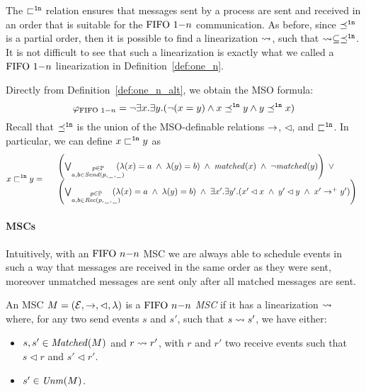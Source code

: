 The ${\sqsubset^{\mathtt{1n}}}$ relation ensures that messages sent by a process are sent and received in an order that is suitable for the $\text{FIFO } 1\mathsf{-}n$ communication. As before, since ${\preceq^{\mathtt{1n}}}$ is a partial order, then it is possible to find a linearization $\rightsquigarrow$, such that $\rightsquigarrow \subseteq \preceq^{\mathtt{1n}}$. It is not difficult to see that such a linearization is exactly what we called a $\text{FIFO } 1\mathsf{-}n$ linearization in Definition~\ref{def:one_n}. 

Directly from  Definition~\ref{def:one_n_alt}, we obtain the MSO formula:
\[
	\varphi_{\text{FIFO } 1\mathsf{-}n} = \neg \exists x.\exists y.(\neg (x = y) \wedge x \preceq^{\mathtt{1n}} y \wedge y \preceq^{\mathtt{1n}} x)
\]
Recall that $\preceq^{\mathtt{1n}}$ is the union of the MSO-definable relations $\to$, $\lhd$, and $\sqsubset^{\mathtt{1n}}$. In particular, we can define $x \sqsubset^{\mathtt{1n}} y$ as 
\[
x \sqsubset^{\mathtt{1n}} y =
\begin{array}{rl}
& \left(
	\bigvee_{\substack{p \in \mathbb{P}\\a,b \in {\mathit{Send}(p,\hspace{0.1em}\underline{\hspace{0.5em}}\hspace{0.1em},\hspace{0.1em}\underline{\hspace{0.5em}}\hspace{0.1em})}}}\hspace{-1em}
	(\lambda(x) = a \;\wedge\; \lambda(y) = b)
	\;\wedge\; \mathit{matched}(x) \;\wedge\; \neg \mathit{matched}(y)
\right) \;\vee\\
& \left(
	\bigvee_{\substack{p \in \mathbb{P}\\a,b \in {\mathit{Rec}(p,\hspace{0.1em}\underline{\hspace{0.5em}}\hspace{0.1em},\hspace{0.1em}\underline{\hspace{0.5em}}\hspace{0.1em})}}}\hspace{-1em}
	(\lambda(x) = a \;\wedge\; \lambda(y) = b)
	\;\wedge\; 
	\exists x'.\exists y'. (x' \lhd x \;\wedge\; y' \lhd y \;\wedge\; x' \to^+ y')
\right)\\
\end{array}
\]


\paragraph{\bf \nn MSCs}
Intuitively, with an $\nn$ MSC we are always able to schedule events in such a way that messages are received in the same order as they were sent, moreover unmatched messages are sent only after all matched messages are sent. 
\begin{definition}[$\nn$ MSC]\label{def:n_n}
	An MSC $M = (\mathcal{E},\to,\lhd,\lambda)$ is a \emph{$\nn$ MSC} if it has a linearization $\rightsquigarrow$ where, for any two send events $s$ and $s'$, such that $s \rightsquigarrow s'$, we have either:
	\begin{itemize}%
		\item $s,s' \in \mathit{Matched}(M)$ and $r \rightsquigarrow r'$, with $r$ and $r'$  two receive events such that $s \lhd r$ and $s' \lhd r'$.
		\item $s' \in \mathit{Unm}(M)$.
	\end{itemize}
\end{definition}

